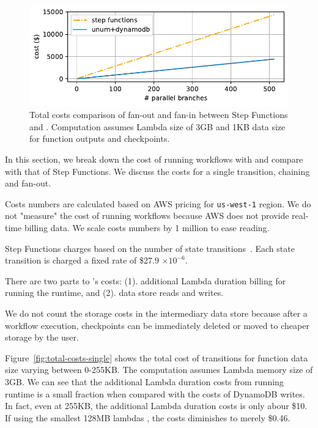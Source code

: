 \begin{figure}[t!]
    \centering
    \includegraphics[width=\columnwidth]{figures/TotalMapCost.pdf}
    \caption{Total costs comparison of fan-out and fan-in between Step
    Functions and \name{}. Computation assumes Lambda size of 3GB and 1KB data
    size for function outputs and checkpoints.}
    \label{fig:total-costs-map}
\end{figure}

In this section, we break down the cost of running workflows with \name{} and
compare with that of Step Functions. We discuss the costs for a single transition,
chaining and fan-out.

Costs numbers are calculated based on AWS pricing for \texttt{us-west-1}
region. We do not "measure" the cost of running workflows because AWS does not
provide real-time billing data. We scale costs numbers by 1 million to ease
reading.

Step Functions charges based on the number of state
transitions~\cite{aws-step-functions-pricing}. Each state transition is charged
a fixed rate of \$27.9 $ \times 10^{-6}$.

There are two parts to \name{}'s costs: (1). additional Lambda duration
billing for running the \name{} runtime, and (2). data store reads and writes.

We do not count the storage costs in the intermediary data store because after
a workflow execution, checkpoints can be immediately deleted or moved to
cheaper storage by the user.

Figure~\ref{fig:total-costs-single} shows the total cost of transitions for
function data size varying between 0-255KB. The computation assumes Lambda
memory size of 3GB. We can see that the additional Lambda duration costs from
running \name{} runtime is a small fraction when compared with the costs of
DynamoDB writes. 
In fact, even at 255KB, the additional Lambda
duration costs is only abour \$10. If using the smallest 128MB lambdas , the
costs diminishes to merely \$0.46.

